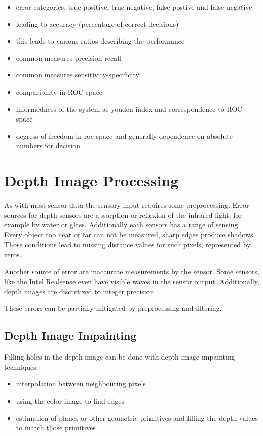 \begin{itemize}
    \item error categories, true positive, true negative, false postive and false negative
    \item leading to accuracy (percentage of correct decisions)
    \item this leads to various ratios describing the performance 
    \item common measures precision-recall
    \item common measures sensitivity-specificity
    \item comparibility in \gls{ROC} space
    \item informedness of the system as youden index and correspondence to \gls{ROC} space
    \item degress of freedom in roc space and generally dependence on absolute numbers for decision 
\end{itemize}

\section{Depth Image Processing}

As with most sensor data the sensory input requires some preprocessing.
Error sources for depth sensors are absorption or reflexion of the infrared light, for example by water or glass.
Additionally each sensors has a range of sensing.
Every object too near or far can not be measured, sharp edges produce shadows.
Those conditions lead to missing distance values for such pixels, represented by zeros.

Another source of error are inaccurate measurements by the sensor.
Some sensors, like the Intel Realsense even have visible waves in the sensor output.
Additionally, depth images are discretized to integer precision.

These errors can be partially mitigated by preprocessing and filtering.

\subsection{Depth Image Impainting}

Filling holes in the depth image can be done with depth image impainting techniques.

\begin{itemize}
    \item interpolation between neighbouring pixels
    \item using the color image to find edges
    \item estimation of planes or other geometric primitives and filling the depth values to match those primitives
\end{itemize}

